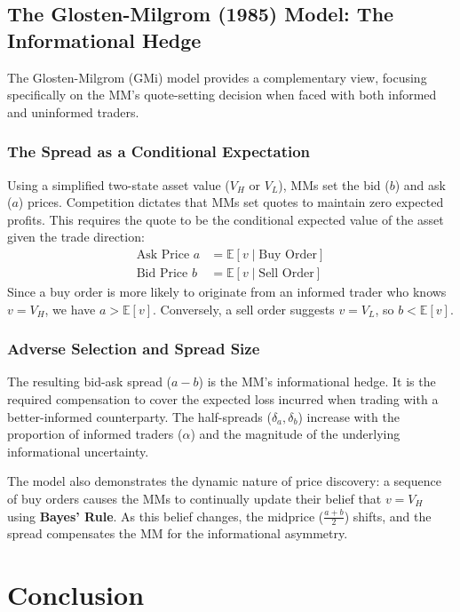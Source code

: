 \subsection{The Glosten-Milgrom (1985) Model: The Informational Hedge}
\label{sec:glosten-milgrom}

The Glosten-Milgrom (GMi) model provides a complementary view, focusing specifically on the MM's quote-setting decision when faced with both informed and uninformed traders.

\subsubsection{The Spread as a Conditional Expectation}
Using a simplified two-state asset value ($V_H$ or $V_L$), MMs set the bid ($b$) and ask ($a$) prices. Competition dictates that MMs set quotes to maintain zero expected profits. This requires the quote to be the conditional expected value of the asset given the trade direction:
\begin{align}
    \text{Ask Price } a &= \mathbb{E}[v \mid \text{Buy Order}] \\
    \text{Bid Price } b &= \mathbb{E}[v \mid \text{Sell Order}]
\end{align}
Since a buy order is more likely to originate from an informed trader who knows $v=V_H$, we have $a > \mathbb{E}[v]$. Conversely, a sell order suggests $v=V_L$, so $b < \mathbb{E}[v]$.

\subsubsection{Adverse Selection and Spread Size}
The resulting bid-ask spread ($a-b$) is the MM's informational hedge. It is the required compensation to cover the expected loss incurred when trading with a better-informed counterparty. The half-spreads ($\delta_a, \delta_b$) increase with the proportion of informed traders ($\alpha$) and the magnitude of the underlying informational uncertainty.

The model also demonstrates the dynamic nature of price discovery: a sequence of buy orders causes the MMs to continually update their belief that $v=V_H$ using \textbf{Bayes' Rule}. As this belief changes, the midprice ($\displaystyle{\frac{a+b}{2}}$) shifts, and the spread compensates the MM for the informational asymmetry.

\section{Conclusion}
\label{sec:conclusion}

